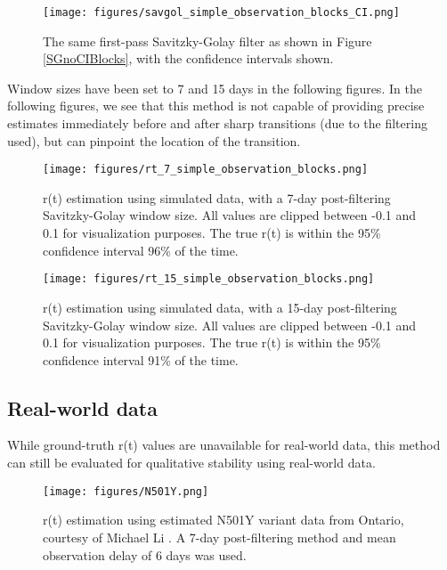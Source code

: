 \documentclass{article}
\begin{document}
\begin{figure}[h!]
\centering
\texttt{[image: figures/savgol\_simple\_observation\_blocks\_CI.png]}
\caption{The same first-pass Savitzky-Golay filter as shown in Figure \ref{SGnoCIBlocks}, with the confidence intervals shown.} 

\end{figure}

Window sizes have been set to 7 and 15 days in the following figures. In the following figures, we see that this method is not capable of providing precise estimates immediately before and after sharp transitions (due to the filtering used), but can pinpoint the location of the transition.


\begin{figure}[h!]
\centering
\texttt{[image: figures/rt\_7\_simple\_observation\_blocks.png]}
\caption{r(t) estimation using simulated data, with a 7-day post-filtering Savitzky-Golay window size. All values are clipped between -0.1 and 0.1 for visualization purposes. The true r(t) is within the 95\% confidence interval 96\% of the time.}
\end{figure}

\clearpage
\begin{figure}[h!]
\centering
\texttt{[image: figures/rt\_15\_simple\_observation\_blocks.png]}
\caption{r(t) estimation using simulated data, with a 15-day post-filtering Savitzky-Golay window size. All values are clipped between -0.1 and 0.1 for visualization purposes. The true r(t) is within the 95\% confidence interval 91\% of the time.}
\end{figure}




\subsection{Real-world data}
While ground-truth r(t) values are unavailable for real-world data, this method can still be evaluated for qualitative stability using real-world data. 

\clearpage

\begin{figure}[h!]
\centering
\texttt{[image: figures/N501Y.png]}
\caption{r(t) estimation using estimated N501Y variant data from Ontario, courtesy of Michael Li \cite{mli}. A 7-day post-filtering method and mean observation delay of 6 days was used.}

\end{figure}
\end{document}
